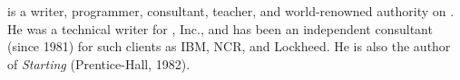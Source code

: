 
\cleardoublepage
\setcounter{page}{1}


\cleardoublepage
\vspace*{100pt}
\noindent {} is a writer, programmer, consultant, teacher, and
world-renowned authority on \Forth{}. He was a technical writer for
\Forth{}, Inc., and has been an independent consultant (since 1981) for
such clients as IBM, NCR, and Lockheed. He is also the author of
\emph{Starting \Forth{}} (Prentice-Hall, 1982).
\vfill


